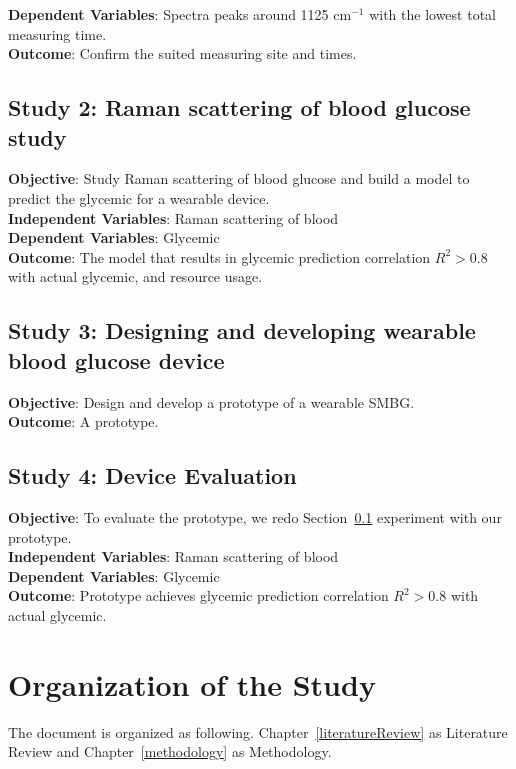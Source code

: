 \begin{sloppypar}
    \textbf{Dependent Variables}: Spectra peaks around 1125 $\text{cm}^{-1}$ with the lowest total measuring time.\\
    \textbf{Outcome}: Confirm the suited measuring site and times.
\end{sloppypar}


\subsection{Study 2: Raman scattering of blood glucose study}\label{intro-s2}

\textbf{Objective}: Study Raman scattering of blood glucose and build a model to predict the glycemic for a wearable device.\\
\textbf{Independent Variables}: Raman scattering of blood\\
\textbf{Dependent Variables}: Glycemic\\
\textbf{Outcome}: The model that results in glycemic prediction correlation $R^2 > 0.8$ with actual glycemic, and resource usage.

\subsection{Study 3: Designing and developing wearable blood glucose device}

\textbf{Objective}: Design and develop a prototype of a wearable SMBG.\\
\textbf{Outcome}: A prototype.


\subsection{Study 4: Device Evaluation}

\textbf{Objective}: To evaluate the prototype, we redo Section~\ref{intro-s2} experiment with our prototype.\\
\textbf{Independent Variables}: Raman scattering of blood\\
\textbf{Dependent Variables}: Glycemic\\
\textbf{Outcome}: Prototype achieves glycemic prediction correlation $R^2 > 0.8$ with actual glycemic.


\section{Organization of the Study}

The document is organized as following. Chapter~\ref{literatureReview} as Literature Review and Chapter~\ref{methodology} as Methodology.